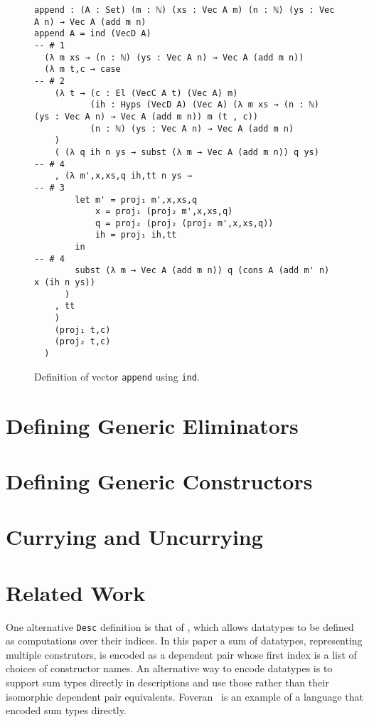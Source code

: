 \documentclass[preprint,nonatbib]{sigplanconf}
\begin{document}
\begin{figure*}
\caption{Definition of vector {\tt append} using {\tt ind}.}
\label{fig:ind:append}

\begin{verbatim}
append : (A : Set) (m : ℕ) (xs : Vec A m) (n : ℕ) (ys : Vec A n) → Vec A (add m n) 
append A = ind (VecD A)                                         -- # 1
  (λ m xs → (n : ℕ) (ys : Vec A n) → Vec A (add m n)) 
  (λ m t,c → case                                               -- # 2
    (λ t → (c : El (VecC A t) (Vec A) m)
           (ih : Hyps (VecD A) (Vec A) (λ m xs → (n : ℕ) (ys : Vec A n) → Vec A (add m n)) m (t , c))
           (n : ℕ) (ys : Vec A n) → Vec A (add m n)
    )
    ( (λ q ih n ys → subst (λ m → Vec A (add m n)) q ys)       -- # 4
    , (λ m',x,xs,q ih,tt n ys →                                -- # 3
        let m' = proj₁ m',x,xs,q
            x = proj₁ (proj₂ m',x,xs,q)
            q = proj₂ (proj₂ (proj₂ m',x,xs,q))
            ih = proj₁ ih,tt
        in                                                      -- # 4
        subst (λ m → Vec A (add m n)) q (cons A (add m' n) x (ih n ys))
      )
    , tt
    )
    (proj₁ t,c)
    (proj₂ t,c)
  )
\end{verbatim}

\end{figure*}

\section{Defining Generic Eliminators}
\label{sec:elim}

\section{Defining Generic Constructors}
\label{sec:init}

\section{Currying and Uncurrying}
\label{sec:curry}


\section{Related Work}
\label{sec:related-work}

One alternative {\tt Desc} definition is that of \citet{dagand:phd}, which
allows datatypes to be defined as computations over their indices.
In this paper a sum of datatypes, representing multiple construtors,
is encoded as a dependent pair whose first index is a list of choices
of constructor names. An alternative way to encode datatypes is to
support sum types directly in descriptions and use those rather than
their isomorphic dependent pair equivalents. Foveran~\citep{foveran} is
an example of a language that encoded sum types directly.


\clearpage

\acks




\end{document}
